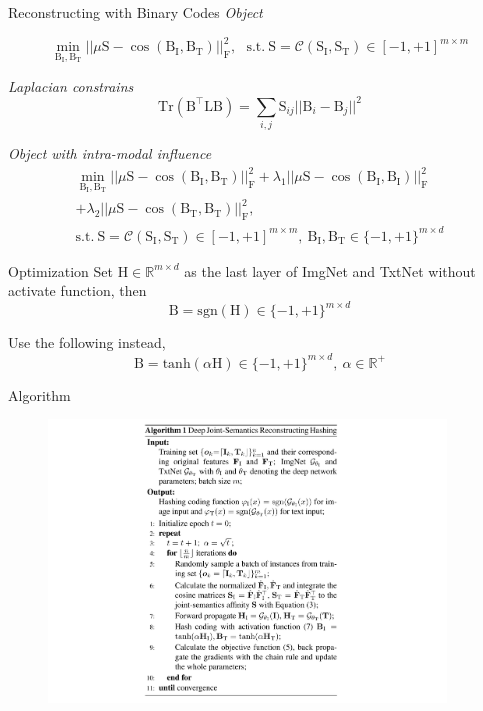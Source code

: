 \documentclass[serif]{beamer}
\begin{document}
\begin{frame}{Reconstructing with Binary Codes}
\emph{Object}

$$
\min_{\mathrm{B_I},\mathrm{B_T}} || \mu\mathrm{S} - \cos(\mathrm{B_I}, \mathrm{B_T})||_\mathrm{F}^2, ~~~\mathrm{s.t.}~ \mathrm{S} = \mathcal{C}(\mathrm{S_I}, \mathrm{S_T}) \in [-1, +1]^{m \times m}
$$

\emph{Laplacian constrains}
$$
\mathrm{Tr}(\mathrm{B}^\top\mathrm{L}\mathrm{B}) = \sum_{i, j} \mathrm{S}_{ij} ||\mathrm{B}_i - \mathrm{B}_j||^2
$$

\emph{Object with intra-modal influence}
$$
\begin{aligned}
\min_{\mathrm{B_I},\mathrm{B_T}} || \mu\mathrm{S} - \cos(\mathrm{B_I}, \mathrm{B_T})||_\mathrm{F}^2 + \lambda_1 || \mu\mathrm{S} - \cos(\mathrm{B_I}, \mathrm{B_I})||_\mathrm{F}^2 \\
+ \lambda_2 || \mu\mathrm{S} - \cos(\mathrm{B_T}, \mathrm{B_T})||_\mathrm{F}^2, \\ 
\mathrm{s.t.}~ \mathrm{S} = \mathcal{C}(\mathrm{S_I}, \mathrm{S_T}) \in [-1, +1]^{m \times m},~ \mathrm{B_I}, \mathrm{B_T} \in  \{-1, +1\}^{m \times d} 
\end{aligned}
$$
\end{frame}

\begin{frame}{Optimization}
Set $\mathrm{H} \in \mathbb{R}^{m \times d}$ as the last layer of ImgNet and TxtNet without activate function, then
$$
\mathrm{B} = \mathrm{sgn}(\mathrm{H}) \in \{-1, +1\}^{m \times d}
$$

Use the following instead,
$$
\mathrm{B} = \mathrm{tanh}(\alpha\mathrm{H}) \in \{-1, +1\}^{m \times d},~ \alpha \in \mathbb{R}^+
$$
\end{frame}

\begin{frame}{Algorithm}
\begin{figure}
    \includegraphics[height=7.5cm]{1.PNG}
\end{figure}
\end{frame}
\end{document}
